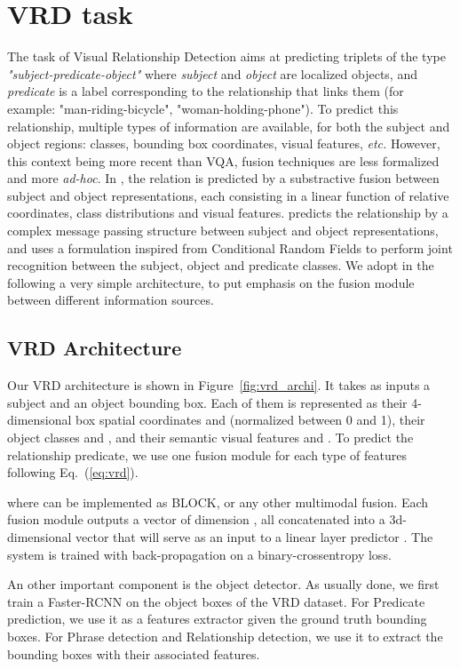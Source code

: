 \documentclass[letterpaper]{article} \usepackage{aaai19}  \usepackage{times}  \usepackage{helvet}  \usepackage{courier}  \usepackage{url}  \usepackage{graphicx}  \usepackage{booktabs}       \usepackage{comment}
\begin{document}
\section{VRD task}
\label{section:vrd_exp}
The task of Visual Relationship Detection aims at predicting triplets of the type \textit{"subject-predicate-object"} where \textit{subject} and \textit{object} are localized objects, and \textit{predicate} is a label corresponding to the relationship that links them (for example: "man-riding-bicycle", "woman-holding-phone"). To predict this relationship, multiple types of information are available, for both the subject and object regions: classes, bounding box coordinates, visual features, \textit{etc.} However, this context being more recent than VQA, fusion techniques are less formalized and more \textit{ad-hoc}. 
In \cite{Zhang_2017_CVPR}, the relation is predicted by a substractive fusion between subject and object representations, each consisting in a linear function of relative coordinates, class distributions and visual features. \cite{Li_2017_CVPR} predicts the relationship by a complex message passing structure between subject and object representations, and \cite{dai2017detecting} uses a formulation inspired from Conditional Random Fields to perform joint recognition between the subject, object and predicate classes.
We adopt in the following a very simple architecture, to put emphasis on the fusion module between different information sources. 

\subsection{VRD Architecture}
Our VRD architecture is shown in Figure~\ref{fig:vrd_archi}. It takes as inputs a subject and an object bounding box. Each of them is represented as their  4-dimensional box spatial coordinates  and  (normalized between 0 and 1), their object classes  and , and their semantic visual features  and . To predict the relationship predicate, we use one fusion module for each type of features following Eq.~(\ref{eq:vrd}).

where  can be implemented as BLOCK, or any other multimodal fusion. Each fusion module outputs a vector of dimension , all concatenated into a 3d-dimensional vector that will serve as an input to a linear layer predictor . The system is trained with back-propagation on a binary-crossentropy loss.

An other important component is the object detector. As usually done, we first train a Faster-RCNN on the object boxes of the VRD dataset. For Predicate prediction, we use it as a features extractor given the ground truth bounding boxes. For Phrase detection and Relationship detection, we use it to extract the bounding boxes with their associated features.
\end{document}
